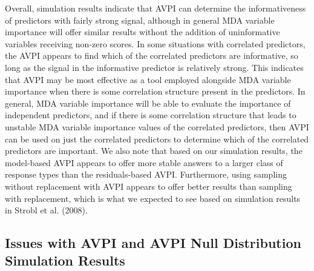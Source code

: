 \documentclass[12pt,twoside]{reedthesis}
\theoremstyle{definition}
\theoremstyle{definition}
\theoremstyle{definition}
\theoremstyle{remark}
\begin{document}
Overall, simulation results indicate that AVPI can determine the
informativeness of predictors with fairly strong signal, although in
general MDA variable importance will offer similar results without the
addition of uninformative variables receiving non-zero scores. In some
situations with correlated predictors, the AVPI appears to find which of
the correlated predictors are informative, so long as the signal in the
informative predictor is relatively strong. This indicates that AVPI may
be most effective as a tool employed alongside MDA variable importance
when there is some correlation structure present in the predictors. In
general, MDA variable importance will be able to evaluate the importance
of independent predictors, and if there is some correlation structure
that leads to unstable MDA variable importance values of the correlated
predictors, then AVPI can be used on just the correlated predictors to
determine which of the correlated predictors are important. We also note
that based on our simulation results, the model-based AVPI appears to
offer more stable answers to a larger class of response types than the
residuals-based AVPI. Furthermore, using sampling without replacement
with AVPI appears to offer better results than sampling with
replacement, which is what we expected to see based on simulation
results in Strobl et al. (2008). \par 

\subsection{Issues with AVPI and AVPI Null Distribution Simulation
Results}\label{issues-with-avpi-and-avpi-null-distribution-simulation-results}
\end{document}
